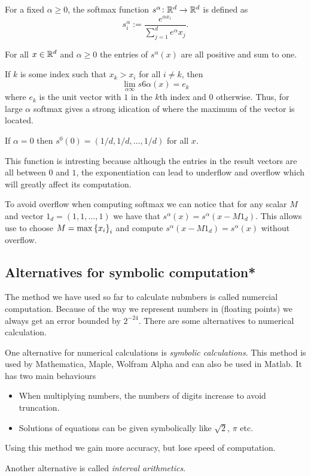 \documentclass[11pt,a4paper]{article}
\begin{document}
\begin{definition}
  For a fixed $\alpha \geq 0$, the softmax function 
  $s^{\alpha} \colon \mathbb{R}^d \to \mathbb{R}^d$ is defined as
  \[
    s^{\alpha}_i := \frac{e^{\alpha x_i}}{\sum_{j=1}^{d} e^{\alpha} x_j}.
  \]
\end{definition}
\begin{remark}
  For all $x \in \mathbb{R}^d$ and $\alpha \geq 0$ the entries of $s^{\alpha}(x)$
  are all positive and sum to one.
\end{remark}
\begin{remark}
  If $k$ is some index such that $x_k > x_i$ for all $i \neq k$, then
  \[
    \lim_{\alpha \infty} s6{\alpha}(x) = e_k
  \]
  where $e_k$ is the unit vector with $1$ in the $k$th index and $0$ otherwise.
  Thus, for large $\alpha$ softmax gives a strong idication of where the
  maximum of the vector is located.
\end{remark}
\begin{remark}
  If $\alpha = 0$ then $s^0(0) = (1/d, 1/d, \dots, 1/d)$ for all $x$.
\end{remark}

This function is intresting because although the entries in the result vectors
are all between $0$ and $1$, the exponentiation can lead to underflow and
overflow which will greatly affect its computation.

To avoid overflow when computing softmax we can notice that for any scalar
$M$ and vector $1_d = (1, 1, \dots, 1)$ we have that 
$s^{\alpha}(x) = s^{\alpha}(x - M 1_d)$.
This allows use to choose $M = \max\set{x_i}_i$ and compute
$s^{\alpha}(x - M 1_d) = s^{\alpha}(x)$ without overflow.

\subsection{Alternatives for symbolic computation*}

The method we have used so far to calculate nubmbers is called numercial
computation.
Because of the way we represent numbers in (floating points) we always
get an error bounded by $2^{-24}$.
There are some alternatives to numerical calculation.

One alternative for numerical calculations is \emph{symbolic calculations}.
This method is used by Mathematica, Maple, Wolfram Alpha 
and can also be used in Matlab.
It has two main behaviours
\begin{itemize}
  \item When multiplying numbers, the numbers of digits increase to avoid
    truncation.
  \item Solutions of equations can be given symbolically like $\sqrt{2}$,
    $\pi$ etc.
\end{itemize}
Using this method we gain more accuracy, but lose speed of computation.

Another alternative is called \emph{interval arithmetics}.
\end{document}

